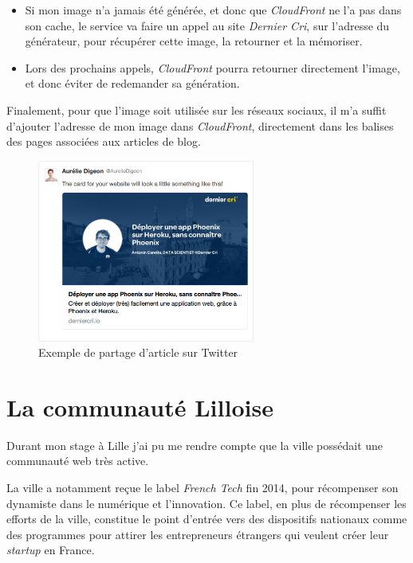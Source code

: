 \begin{itemize}
\item
  Si mon image n'a jamais été générée, et donc que \emph{CloudFront} ne
  l'a pas dans son cache, le service va faire un appel au site
  \emph{Dernier Cri}, sur l'adresse du générateur, pour récupérer cette
  image, la retourner et la mémoriser.
\item
  Lors des prochains appels, \emph{CloudFront} pourra retourner
  directement l'image, et donc éviter de redemander sa génération.
\end{itemize}

\bigskip

Finalement, pour que l'image soit utilisée sur les réseaux sociaux, il
m'a suffit d'ajouter l'adresse de mon image dans \emph{CloudFront},
directement dans les balises des pages associées aux articles de blog.

\begin{figure}[h]
  \centering
  \includegraphics[height=6cm]{figures/partage-blog.png}
  \caption{Exemple de partage d'article sur Twitter}
\end{figure}

\newpage

\section{La communauté Lilloise}\label{la-communautuxe9-lilloise}

Durant mon stage à Lille j'ai pu me rendre compte que la ville possédait
une communauté web très active.

\bigskip

La ville a notamment reçue le label \emph{French Tech} fin 2014, pour
récompenser son dynamiste dans le numérique et l'innovation. Ce label,
en plus de récompenser les efforts de la ville, constitue le point
d'entrée vers des dispositifs nationaux comme des programmes pour
attirer les entrepreneurs étrangers qui veulent créer leur
\emph{startup} en France.

